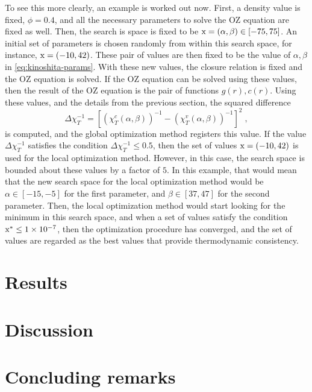 To see this more clearly, an example is worked out now. First, a density value is fixed, 
\(\phi = 0.4\), and all the necessary parameters to solve the OZ equation are fixed as 
well. Then, the search is space is fixed to be \(\rm{x} = \left(\alpha, \beta\right) \in \left[-75, 75\right]\). 
An initial set of parameters is chosen randomly from within this search space, for 
instance, \(\rm{x} = \left(-10, 42\right)\). These pair of values are then fixed to be the 
value of \(\alpha, \beta\) in \autoref{eq:kinoshita-params}. With these new values, the 
closure relation is fixed and the OZ equation is solved. If the OZ equation can be solved 
using these values, then the result of the OZ equation is the pair of functions 
\(g(r), c(r)\). Using these values, and the details from the previous section, the squared 
difference 
\[
    \Delta \chi^{-1}_{T} = {\left[ {\left(\chi_{T}^{c} \left(\alpha, \beta\right) \right)}^{-1} - {\left(\chi_{T}^{v} \left(\alpha, \beta\right) \right)}^{-1} \right]}^2 
\; ,
\] 
is computed, and the global optimization method registers this value. If the value 
\(\Delta \chi^{-1}_{T}\) satisfies the condition \(\Delta \chi^{-1}_{T} \leq 0.5\), then 
the set of values \(\rm{x} = \left(-10, 42\right)\) is used for the local optimization 
method. However, in this case, the search space is bounded about these values by a factor 
of \(5\). In this example, that would mean that the new search space for the local 
optimization method would be \(\alpha \in [-15, -5]\) for the first parameter, and 
\(\beta \in [37, 47]\) for the second parameter. Then, the local optimization method would 
start looking for the minimum in this search space, and when a set of values satisfy the 
condition \(\rm{x}^{*} \leq \num{1e-7}\), then the optimization procedure has converged, 
and the set of values are regarded as the best values that provide thermodynamic 
consistency.

\section{Results}

\section{Discussion}

\section{Concluding remarks}